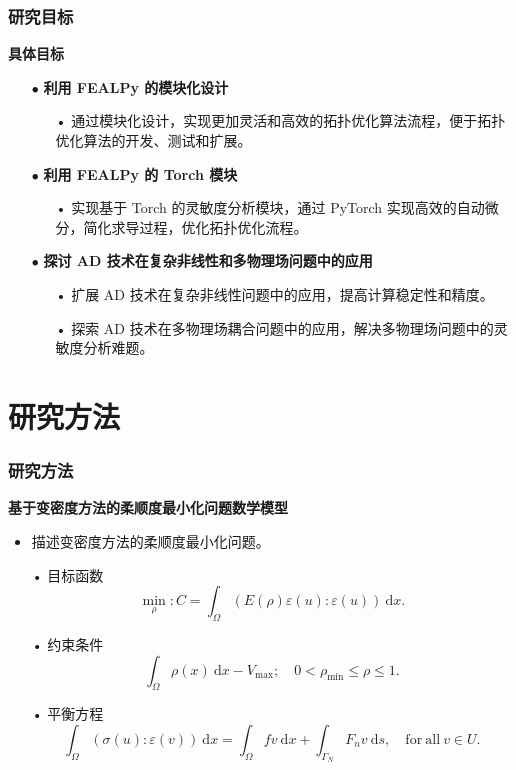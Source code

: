 \documentclass{beamer}
\numberwithin{subsection}{section}
\begin{document}
\begin{frame}
	\frametitle{研究目标}
	\textbf{具体目标}
    \begin{itemize}
        \item[$\bullet$]\textbf{利用 FEALPy 的模块化设计}
        \begin{itemize}
            \item[•]通过模块化设计，实现更加灵活和高效的拓扑优化算法流程，便于拓扑优化算法的开发、测试和扩展。
        \end{itemize}
        \vspace{0.3cm}
        \item[$\bullet$]\textbf{利用 FEALPy 的 Torch 模块}
        \begin{itemize}
	        \item[•]实现基于 Torch 的灵敏度分析模块，通过 PyTorch 实现高效的自动微分，简化求导过程，优化拓扑优化流程。
        \end{itemize}
        \vspace{0.3cm}
        \item[$\bullet$]\textbf{探讨 AD 技术在复杂非线性和多物理场问题中的应用}
        \begin{itemize}
            \item[•]扩展 AD 技术在复杂非线性问题中的应用，提高计算稳定性和精度。
            \item[•]探索 AD 技术在多物理场耦合问题中的应用，解决多物理场问题中的灵敏度分析难题。
        \end{itemize}
    \end{itemize}
\end{frame}

\section{研究方法}

\begin{frame}
	\frametitle{研究方法}
	 \textbf{基于变密度方法的柔顺度最小化问题数学模型}
	 \begin{itemize}
	            \item 描述变密度方法的柔顺度最小化问题。
	            \item[•]目标函数
	            $$\min_{\rho} :C = \int_{\Omega}(E(\rho)\varepsilon(u):\varepsilon(u))~\mathrm{d}x.$$
	            \item[•]约束条件
	            $$\int_\Omega\rho(x)~\mathrm{d}x - V_{\max};\quad0<\rho_{\min}\leq\rho\leq1.$$
	            \item[•]平衡方程
	            $$\int_{\Omega}(\sigma(u):\varepsilon(v))~\mathrm{d}x = \int_{\Omega}f{v}~\mathrm{d}x + \int_{\Gamma_N}F_n{v}~\mathrm{d}s,\quad\mathrm{for~all}~v\in{U}.$$
	 \end{itemize}
\end{frame}
\end{document}
